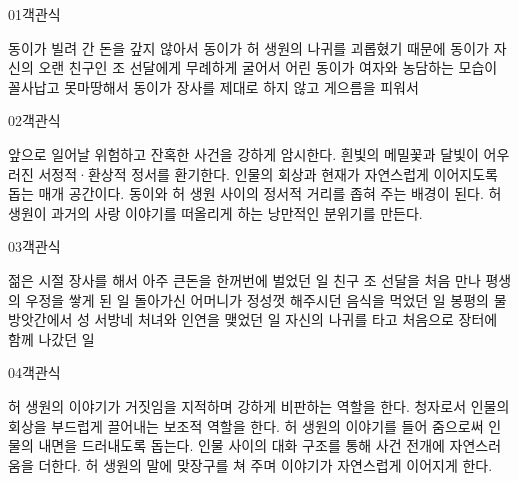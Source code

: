 \documentclass[fs85,seriesRus]{korfarm-base}
\begin{document}
\par\medskip
\kfBeginMC
\begin{kfQBlock}{01}{객관식}
\begin{kfChoices}
\kfChoice 동이가 빌려 간 돈을 갚지 않아서
\kfChoice 동이가 허 생원의 나귀를 괴롭혔기 때문에
\kfChoice 동이가 자신의 오랜 친구인 조 선달에게 무례하게 굴어서
\kfChoice 어린 동이가 여자와 농담하는 모습이 꼴사납고 못마땅해서
\kfChoice 동이가 장사를 제대로 하지 않고 게으름을 피워서
\end{kfChoices}
\end{kfQBlock}
\begin{kfQBlock}{02}{객관식}
\begin{kfChoices}
\kfChoice 앞으로 일어날 위험하고 잔혹한 사건을 강하게 암시한다.
\kfChoice 흰빛의 메밀꽃과 달빛이 어우러진 서정적·환상적 정서를 환기한다.
\kfChoice 인물의 회상과 현재가 자연스럽게 이어지도록 돕는 매개 공간이다.
\kfChoice 동이와 허 생원 사이의 정서적 거리를 좁혀 주는 배경이 된다.
\kfChoice 허 생원이 과거의 사랑 이야기를 떠올리게 하는 낭만적인 분위기를 만든다.
\end{kfChoices}
\end{kfQBlock}
\begin{kfQBlock}{03}{객관식}
\begin{kfChoices}
\kfChoice 젊은 시절 장사를 해서 아주 큰돈을 한꺼번에 벌었던 일
\kfChoice 친구 조 선달을 처음 만나 평생의 우정을 쌓게 된 일
\kfChoice 돌아가신 어머니가 정성껏 해주시던 음식을 먹었던 일
\kfChoice 봉평의 물방앗간에서 성 서방네 처녀와 인연을 맺었던 일
\kfChoice 자신의 나귀를 타고 처음으로 장터에 함께 나갔던 일
\end{kfChoices}
\end{kfQBlock}
\begin{kfQBlock}{04}{객관식}
\begin{kfChoices}
\kfChoice 허 생원의 이야기가 거짓임을 지적하며 강하게 비판하는 역할을 한다.
\kfChoice 청자로서 인물의 회상을 부드럽게 끌어내는 보조적 역할을 한다.
\kfChoice 허 생원의 이야기를 들어 줌으로써 인물의 내면을 드러내도록 돕는다.
\kfChoice 인물 사이의 대화 구조를 통해 사건 전개에 자연스러움을 더한다.
\kfChoice 허 생원의 말에 맞장구를 쳐 주며 이야기가 자연스럽게 이어지게 한다.
\end{kfChoices}
\end{kfQBlock}
\end{document}
